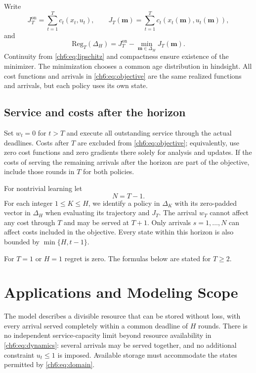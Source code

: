 \documentclass[11pt]{article}
\newcommand{\Reg}{\mathrm{Reg}}
\theoremstyle{plain}
\theoremstyle{remark}
\numberwithin{equation}{section}
\begin{document}
Write
\begin{equation}\label{ch6:eq:objective}
 J_T^{\mathrm{on}}=\sum_{t=1}^Tc_t(x_t,u_t),\qquad
 J_T(\mathbf m)=\sum_{t=1}^Tc_t(x_t(\mathbf m),u_t(\mathbf m)),
\end{equation}
and
\begin{equation}\label{ch6:eq:regret}
 \Reg_T(\Delta_H)=J_T^{\mathrm{on}}-\min_{\mathbf m\in\Delta_H}J_T(\mathbf m).
\end{equation}
Continuity from \eqref{ch6:eq:lipschitz} and compactness ensure existence of the
minimizer. The minimization chooses a common age distribution in hindsight.
All cost functions and arrivals
in \eqref{ch6:eq:objective} are the same realized functions and arrivals,
but each policy uses its own state.

\subsection{Service and costs after the horizon}\label{ch6:subsec:terminal}
Set $w_t=0$ for $t>T$ and execute all outstanding service through the actual
deadlines. Costs after $T$ are excluded from \eqref{ch6:eq:objective}; equivalently,
use zero cost functions and zero gradients there solely for analysis and
updates. If the costs of serving the remaining arrivals after the horizon are
part of the objective, include those rounds in $T$ for both policies.

For nontrivial learning let
\begin{equation}\label{ch6:eq:horizons}
 N=T-1.
\end{equation}
For each integer $1\le K\le H$, we identify a policy in $\Delta_K$ with its zero-padded
vector in $\Delta_H$ when evaluating its trajectory and $J_T$.
The arrival $w_T$ cannot affect any cost through $T$ and may be served at
$T+1$. Only arrivals $s=1,\ldots,N$ can affect costs included in the objective.
Every state within this horizon is also bounded by $\min\{H,t-1\}$.

For $T=1$ or $H=1$ regret is zero. The formulas below are stated for
$T\ge2$.

\section{Applications and Modeling Scope}
\label{ch6:sec:applications}

The model describes a divisible resource that can be stored without loss,
with every arrival served completely within a common deadline of $H$
rounds. There is no
independent service-capacity limit beyond resource availability in
\eqref{ch6:eq:dynamics}: several arrivals may be served together, and no
additional constraint $u_t\le1$ is imposed. Available storage must accommodate
the states permitted by \eqref{ch6:eq:domain}.
\end{document}
